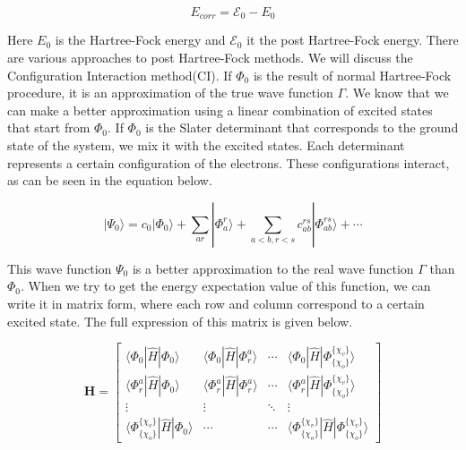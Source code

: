 \documentclass[twoside,twocolumn,9pt]{article}
\begin{document}
\begin{equation}\label{eq:Ecorr}
  E_{corr} = \mathcal{E}_0 - E_0
\end{equation}

Here $E_0$ is the Hartree-Fock energy and $\mathcal{E}_0$ it the post Hartree-Fock energy. There are various approaches to post Hartree-Fock methods. We will discuss the
Configuration Interaction method(CI).
If $\Phi_0$ is the result of normal Hartree-Fock procedure, it is an approximation of the true wave function $\Gamma$. We know that we can make a better approximation
using a linear combination of excited states that start from $\Phi_0$\cite{Szabo1996}. If $\Phi_0$ is the Slater determinant that corresponds to the ground state of the system, we
mix it with the excited states. Each determinant represents a certain configuration of the electrons. These configurations interact, as can be seen in the equation below.

\begin{equation}\label{eq:lincomb}
  |\Psi_0\rangle = c_0|\Phi_0\rangle + \sum_{ar}|\Phi_a^r\rangle + \sum_{a<b,r<s}c_{ab}^{rs}|\Phi^{rs}_{ab} \rangle + \cdots
\end{equation}

This wave function $\Psi_0$ is a better approximation to the real wave function $\Gamma$ than $\Phi_0$. When we try to get the energy expectation value of this function, we can write
it in matrix form, where each row and column correspond to a certain excited state. The full expression of this matrix is given below.

\begin{equation}\label{eq:hamexp1}
  \mathbf{H} = \begin{bmatrix}
    \langle \Phi_0 | \hat{H} | \Phi_0 \rangle                         & \langle \Phi_0 | \hat{H} | \Phi_r^a \rangle   & \cdots & \langle \Phi_0 | \hat{H} | \Phi_{\{\chi_o\}}^{\{\chi_v\}} \rangle \\
    \langle \Phi_r^a | \hat{H} | \Phi_0 \rangle                       & \langle \Phi_r^a | \hat{H} | \Phi_r^a \rangle & \cdots & \langle \Phi_r^a | \hat{H} | \Phi_{\{\chi_o\}}^{\{\chi_v\}} \rangle \\
    \vdots                                                            & \vdots                                        & \ddots & \vdots                                                                                    \\
    \langle \Phi_{\{\chi_o\}}^{\{\chi_v\}} | \hat{H} | \Phi_0 \rangle & \cdots                                         & \cdots & \langle \Phi_{\{\chi_o\}}^{\{\chi_v\}} | \hat{H} | \Phi_{\{\chi_o\}}^{\{\chi_v\}} \rangle
  \end{bmatrix}
\end{equation}
\end{document}
